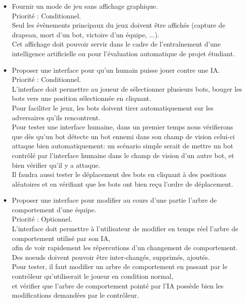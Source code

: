 \begin{itemize}
        \item Fournir un mode de jeu sans affichage graphique. \\
            Priorité : Conditionnel.\\
            Seul les évènements principaux du jeux doivent être affichés (capture de drapeau, mort d'un bot, victoire d'un équipe, ...).\\
            Cet affichage doit pouvoir servir dans le cadre de l'entraînement d'une intelligence artificielle ou pour l'évaluation automatique de projet étudiant.\\

            
        \item Proposer une interface pour qu'un humain puisse jouer contre une IA. \\
            Priorité : Conditionnel. \\
            L'interface doit permettre au joueur de sélectionner plusieurs bots, bouger les bots vers une position sélectionnée en cliquant. \\
            Pour faciliter le jeux, les bots doivent tirer automatiquement sur les adversaires qu'ils rencontrent. \\
            Pour tester une interface humaine, dans un premier temps nous vérifierons que dès qu'un bot détecte un bot ennemi dans son champ de vision celui-ci attaque bien automatiquement: un scénario simple serait de mettre un bot contrôlé par l'interface humaine dans le champ de vision d'un autre bot, et bien vérifier qu'il y a attaque.\\
            Il faudra aussi tester le déplacement des bots en cliquant à des positions aléatoires et en vérifiant que les bots ont bien reçu l'ordre de déplacement. \\ 
            
        \item Proposer une interface pour modifier au cours d'une partie l'arbre de comportement d'une équipe. \\
            Priorité : Optionnel. \\
            L'interface doit permettre à l'utilisateur de modifier en temps réel l'arbre de comportement utilisé par son IA,\\
            afin de voir rapidement les répercutions d'un changement de comportement. \\
            Des noeuds doivent pouvoir être inter-changés, supprimés, ajoutés. \\
            
            Pour tester, il faut modifier un arbre de comportement en passant par le contrôleur qu'utiliserait le joueur en condition normal,\\
            et vérifier que l'arbre de comportement pointé par l'IA possède bien les modifications demandées par le contrôleur.\\

    \end{itemize}

